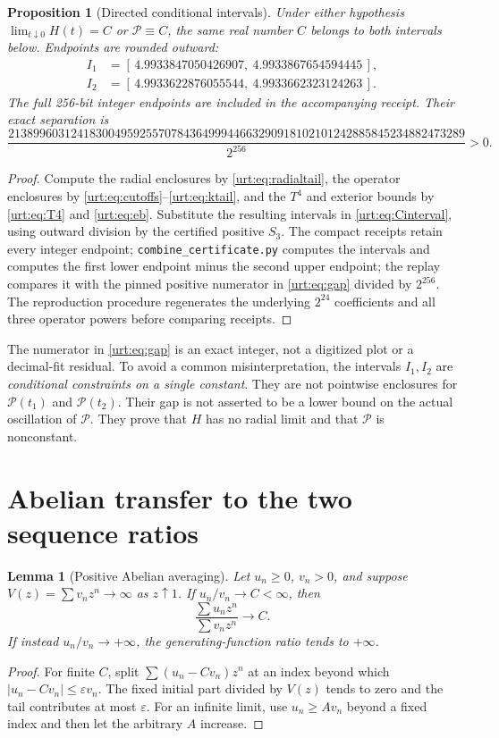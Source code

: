 \documentclass[11pt,letterpaper]{article}
\newtheorem{lemma}[theorem]{Lemma}\newtheorem{proposition}[theorem]{Proposition}\newtheorem{corollary}[theorem]{Corollary}
\theoremstyle{remark}\newtheorem{remark}[theorem]{Remark}
\newcommand{\Pc}{\mathcal P}\newcommand{\Bc}{\mathcal B}\newcommand{\dd}{\mathrm d}
\begin{document}
\begin{proposition}[Directed conditional intervals]\label{urt:prop:intervals}
Under either hypothesis $\lim_{t\downarrow0}H(t)=C$ or $\Pc\equiv C$, the same real number $C$ belongs to both intervals below. Endpoints are rounded outward:
\begin{align*}
 I_1&=[\,4.9933847050426907,\ 4.9933867654594445\,],\\
 I_2&=[\,4.9933622876055544,\ 4.9933662323124263\,].
\end{align*}
The full 256-bit integer endpoints are included in the accompanying receipt. Their exact separation is
\begin{equation}\label{urt:eq:gap}
 \frac{2138996031241830049592557078436499944663290918102101242885845234882473289}{2^{256}}>0.
\end{equation}
\end{proposition}
\begin{proof}
Compute the radial enclosures by \eqref{urt:eq:radialtail}, the operator enclosures by \eqref{urt:eq:cutoffs}--\eqref{urt:eq:ktail}, and the $T^4$ and exterior bounds by \eqref{urt:eq:T4} and \eqref{urt:eq:eb}. Substitute the resulting intervals in \eqref{urt:eq:Cinterval}, using outward division by the certified positive $S_3$. The compact receipts retain every integer endpoint; \texttt{combine\_certificate.py} computes the intervals and computes the first lower endpoint minus the second upper endpoint; the replay compares it with the pinned positive numerator in \eqref{urt:eq:gap} divided by $2^{256}$. The reproduction procedure regenerates the underlying $2^{24}$ coefficients and all three operator powers before comparing receipts.
\end{proof}
The numerator in \eqref{urt:eq:gap} is an exact integer, not a digitized plot or a decimal-fit residual. To avoid a common misinterpretation, the intervals $I_1,I_2$ are \emph{conditional constraints on a single constant}. They are not pointwise enclosures for $\Pc(t_1)$ and $\Pc(t_2)$. Their gap is not asserted to be a lower bound on the actual oscillation of $\Pc$. They prove that $H$ has no radial limit and that $\Pc$ is nonconstant.

\section{Abelian transfer to the two sequence ratios}\label{urt:sec:abelian}
\begin{lemma}[Positive Abelian averaging]\label{urt:lem:abelian}
Let $u_n\ge0$, $v_n>0$, and suppose $V(z)=\sum v_nz^n\to\infty$ as $z\uparrow1$. If $u_n/v_n\to C<\infty$, then
\[
 \frac{\sum u_nz^n}{\sum v_nz^n}\longrightarrow C.
\]
If instead $u_n/v_n\to+\infty$, the generating-function ratio tends to $+\infty$.
\end{lemma}
\begin{proof}
For finite $C$, split $\sum(u_n-Cv_n)z^n$ at an index beyond which $|u_n-Cv_n|\le\varepsilon v_n$. The fixed initial part divided by $V(z)$ tends to zero and the tail contributes at most $\varepsilon$. For an infinite limit, use $u_n\ge A v_n$ beyond a fixed index and then let the arbitrary $A$ increase.
\end{proof}
\end{document}
